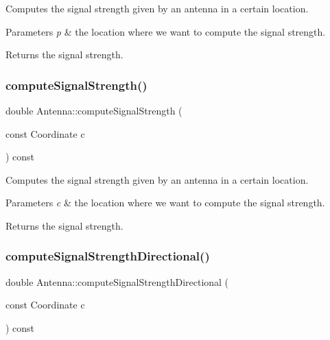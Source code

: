 Computes the signal strength given by an antenna in a certain location. 
\begin{DoxyParams}{Parameters}
{\em p} & the location where we want to compute the signal strength. \\
\hline
\end{DoxyParams}
\begin{DoxyReturn}{Returns}
the signal strength. 
\end{DoxyReturn}
\mbox{\label{class_antenna_ac33fe5654d4e3307a4c1c155b0f89128}} 
\subsubsection{\texorpdfstring{compute\+Signal\+Strength()}{computeSignalStrength()}\hspace{0.1cm}{\footnotesize\ttfamily [2/2]}}
{\footnotesize\ttfamily double Antenna\+::compute\+Signal\+Strength (\begin{DoxyParamCaption}\item[{const Coordinate}]{c }\end{DoxyParamCaption}) const}

Computes the signal strength given by an antenna in a certain location. 
\begin{DoxyParams}{Parameters}
{\em c} & the location where we want to compute the signal strength. \\
\hline
\end{DoxyParams}
\begin{DoxyReturn}{Returns}
the signal strength. 
\end{DoxyReturn}
\mbox{\label{class_antenna_a38bb70c5ca249773512186c34792b43a}} 
\subsubsection{\texorpdfstring{compute\+Signal\+Strength\+Directional()}{computeSignalStrengthDirectional()}}
{\footnotesize\ttfamily double Antenna\+::compute\+Signal\+Strength\+Directional (\begin{DoxyParamCaption}\item[{const Coordinate}]{c }\end{DoxyParamCaption}) const\hspace{0.3cm}{\ttfamily [private]}}

